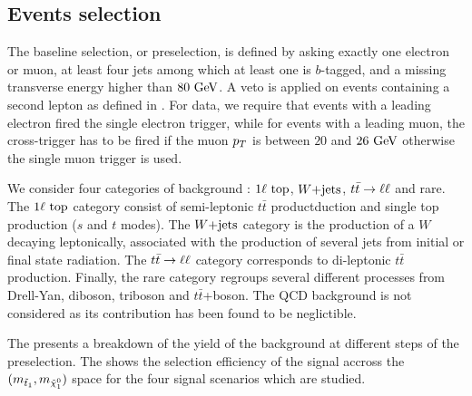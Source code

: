         \subsection{Events selection}

         The baseline selection, or preselection, is defined by asking exactly one electron or muon, at least
        four jets among which at least one is $b$-tagged, and a missing transverse energy higher than $80 ~\text{GeV}$.
        A veto is applied on events containing a second lepton as defined in .
        For data, we require that events with a leading electron fired the single electron
        trigger, while for events with a leading muon, the cross-trigger has to be fired
        if the muon $p_T$ is between $20$ and $26~\text{GeV}$ otherwise the single muon trigger
        is used.

        We consider four categories of background : $1\ell~\text{top}$, $\text{$W$+jets}$, $t\bar{t} \rightarrow \ell \ell$
        and rare. The $1\ell~\text{top}$ category consist of semi-leptonic $t\bar{t}$
        productduction and single top production ($s$ and $t$ modes). The $\text{$W$+jets}$
        category is the production of a $W$ decaying leptonically, associated with the
        production of several jets from initial or final state radiation. The $t\bar{t} \rightarrow \ell \ell$
        category corresponds to di-leptonic $t\bar{t}$ production. Finally, the rare
        category regroups several different processes from Drell-Yan, diboson, triboson and
        $t\bar{t}$+boson. The QCD background is not considered as its contribution has been
        found to be neglictible.

        The  presents a breakdown of the yield of the background
        at different steps of the preselection. The  shows
        the selection efficiency of the signal accross the $(m_{\tilde{t}_1}, m_{\tilde{\chi}_1^0})$
        space for the four signal scenarios which are studied.


